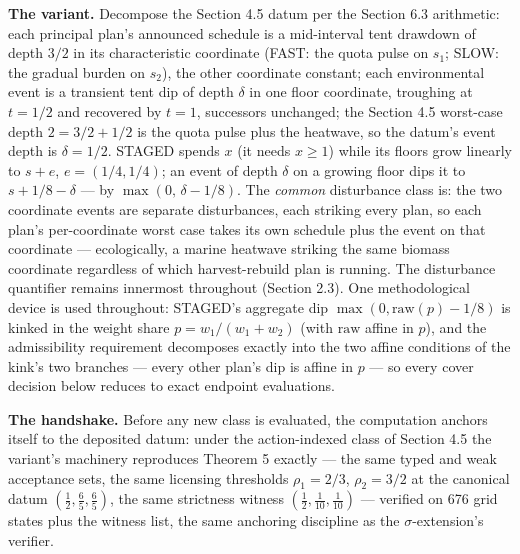 \documentclass[3p,11pt]{elsarticle}
\begin{document}
\textbf{The variant.} Decompose the Section 4.5 datum per the Section 6.3
arithmetic: each principal plan's announced schedule is a mid-interval
tent drawdown of depth \(3/2\) in its characteristic coordinate (FAST:
the quota pulse on \(s_1\); SLOW: the gradual burden on \(s_2\)), the
other coordinate constant; each environmental event is a transient tent
dip of depth \(\delta\) in one floor coordinate, troughing at
\(t = 1/2\) and recovered by \(t = 1\), successors unchanged; the
Section 4.5 worst-case depth \(2 = 3/2 + 1/2\) is the quota pulse plus
the heatwave, so the datum's event depth is \(\delta = 1/2\). STAGED
spends \(x\) (it needs \(x \ge 1\)) while its floors grow linearly
to \(s + e\), \(e = (1/4, 1/4)\); an event of depth \(\delta\) on a
growing floor dips it to \(s + 1/8 - \delta\) --- by
\(\max(0,\, \delta - 1/8)\). The \emph{common} disturbance class
is: the two coordinate events are separate disturbances, each striking
every plan, so each plan's per-coordinate worst case takes its own
schedule plus the event on that coordinate --- ecologically, a marine
heatwave striking the same biomass coordinate regardless of which
harvest-rebuild plan is running. The disturbance quantifier remains
innermost throughout (Section 2.3). One methodological device is used
throughout: STAGED's aggregate dip \(\max(0, \mathrm{raw}(p) - 1/8)\)
is kinked in the weight share \(p = w_1/(w_1 + w_2)\) (with
\(\mathrm{raw}\) affine in \(p\)), and the admissibility requirement
decomposes exactly into the two affine conditions of the kink's two
branches --- every other plan's dip is affine in \(p\) --- so every
cover decision below reduces to exact endpoint evaluations.

\textbf{The handshake.} Before any new class is evaluated, the
computation anchors itself to the deposited datum: under the
action-indexed class of Section 4.5 the variant's machinery reproduces
Theorem 5 exactly --- the same typed and weak acceptance sets, the same
licensing thresholds \(\rho_1 = 2/3\), \(\rho_2 = 3/2\) at the
canonical datum \((\tfrac12, \tfrac65, \tfrac65)\), the same
strictness witness \((\tfrac12, \tfrac1{10}, \tfrac1{10})\) ---
verified on 676 grid states plus the witness list, the same anchoring
discipline as the \(\sigma\)-extension's verifier.
\end{document}
